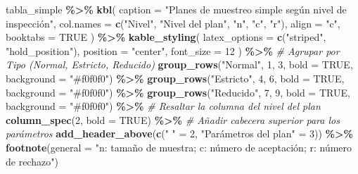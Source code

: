 \documentclass[
  12pt,
]{article}
\newenvironment{Shaded}{\begin{snugshade}}{\end{snugshade}}
\newcommand{\AttributeTok}[1]{\textcolor[rgb]{0.13,0.29,0.53}{#1}}
\newcommand{\CommentTok}[1]{\textcolor[rgb]{0.56,0.35,0.01}{\textit{#1}}}
\newcommand{\ConstantTok}[1]{\textcolor[rgb]{0.56,0.35,0.01}{#1}}
\newcommand{\DecValTok}[1]{\textcolor[rgb]{0.00,0.00,0.81}{#1}}
\newcommand{\FunctionTok}[1]{\textcolor[rgb]{0.13,0.29,0.53}{\textbf{#1}}}
\newcommand{\NormalTok}[1]{#1}
\newcommand{\OtherTok}[1]{\textcolor[rgb]{0.56,0.35,0.01}{#1}}
\newcommand{\SpecialCharTok}[1]{\textcolor[rgb]{0.81,0.36,0.00}{\textbf{#1}}}
\newcommand{\StringTok}[1]{\textcolor[rgb]{0.31,0.60,0.02}{#1}}
\begin{document}
\begin{Shaded}
\begin{Highlighting}[]
\NormalTok{tabla\_simple }\SpecialCharTok{\%\textgreater{}\%}
  \FunctionTok{kbl}\NormalTok{(}
    \AttributeTok{caption =} \StringTok{"Planes de muestreo simple según nivel de inspección"}\NormalTok{,}
    \AttributeTok{col.names =} \FunctionTok{c}\NormalTok{(}\StringTok{"Nivel"}\NormalTok{, }\StringTok{"Nivel del plan"}\NormalTok{, }\StringTok{"n"}\NormalTok{, }\StringTok{"c"}\NormalTok{, }\StringTok{"r"}\NormalTok{),}
    \AttributeTok{align =} \StringTok{"c"}\NormalTok{,}
    \AttributeTok{booktabs =} \ConstantTok{TRUE}
\NormalTok{  ) }\SpecialCharTok{\%\textgreater{}\%}
  \FunctionTok{kable\_styling}\NormalTok{(}
  \AttributeTok{latex\_options =} \FunctionTok{c}\NormalTok{(}\StringTok{"striped"}\NormalTok{, }\StringTok{"hold\_position"}\NormalTok{),}
  \AttributeTok{position =} \StringTok{"center"}\NormalTok{,}
  \AttributeTok{font\_size =} \DecValTok{12}
\NormalTok{  ) }\SpecialCharTok{\%\textgreater{}\%}
  \CommentTok{\# Agrupar por Tipo (Normal, Estricto, Reducido)}
  \FunctionTok{group\_rows}\NormalTok{(}\StringTok{"Normal"}\NormalTok{, }\DecValTok{1}\NormalTok{, }\DecValTok{3}\NormalTok{, }\AttributeTok{bold =} \ConstantTok{TRUE}\NormalTok{, }\AttributeTok{background =} \StringTok{"\#f0f0f0"}\NormalTok{) }\SpecialCharTok{\%\textgreater{}\%}
  \FunctionTok{group\_rows}\NormalTok{(}\StringTok{"Estricto"}\NormalTok{, }\DecValTok{4}\NormalTok{, }\DecValTok{6}\NormalTok{, }\AttributeTok{bold =} \ConstantTok{TRUE}\NormalTok{, }\AttributeTok{background =} \StringTok{"\#f0f0f0"}\NormalTok{) }\SpecialCharTok{\%\textgreater{}\%}
  \FunctionTok{group\_rows}\NormalTok{(}\StringTok{"Reducido"}\NormalTok{, }\DecValTok{7}\NormalTok{, }\DecValTok{9}\NormalTok{, }\AttributeTok{bold =} \ConstantTok{TRUE}\NormalTok{, }\AttributeTok{background =} \StringTok{"\#f0f0f0"}\NormalTok{) }\SpecialCharTok{\%\textgreater{}\%}
  \CommentTok{\# Resaltar la columna del nivel del plan}
  \FunctionTok{column\_spec}\NormalTok{(}\DecValTok{2}\NormalTok{, }\AttributeTok{bold =} \ConstantTok{TRUE}\NormalTok{) }\SpecialCharTok{\%\textgreater{}\%}
  \CommentTok{\# Añadir cabecera superior para los parámetros}
  \FunctionTok{add\_header\_above}\NormalTok{(}\FunctionTok{c}\NormalTok{(}\StringTok{" "} \OtherTok{=} \DecValTok{2}\NormalTok{, }\StringTok{"Parámetros del plan"} \OtherTok{=} \DecValTok{3}\NormalTok{)) }\SpecialCharTok{\%\textgreater{}\%}
  \FunctionTok{footnote}\NormalTok{(}\AttributeTok{general =} \StringTok{"n: tamaño de muestra; c: número de aceptación; r: número de rechazo"}\NormalTok{)}
\end{Highlighting}
\end{Shaded}
\end{document}
